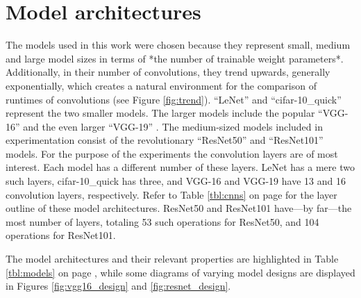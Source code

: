 \section{Model architectures}
The models used in this work were chosen because they represent small, medium and large model sizes in terms of *the number of trainable weight parameters*. Additionally, in their number of convolutions, they trend upwards, generally exponentially, which creates a natural environment for the comparison of runtimes of convolutions (see Figure \ref{fig:trend}). ``LeNet'' \cite{mnist} and ``cifar-10\_quick'' \cite{cifar} represent the two smaller models. The larger models include the popular ``VGG-16'' and the even larger ``VGG-19'' \cite{return}. The medium-sized models included in experimentation consist of the revolutionary ``ResNet50'' and ``ResNet101'' \cite{resnets2} models. For the purpose of the experiments the convolution layers are of most interest. Each model has a different number of these layers. LeNet has a mere two such layers, cifar-10\_quick has three, and VGG-16 and VGG-19 have 13 and 16 convolution layers, respectively. Refer to Table \ref{tbl:cnns} on page \pageref{tbl:cnns} for the layer outline of these model architectures. ResNet50 and ResNet101 have---by far---the most number of layers, totaling 53 such operations for ResNet50, and 104 operations for ResNet101.


The model architectures and their relevant properties are highlighted in Table \ref{tbl:models} on page \pageref{tbl:models}, while some diagrams of varying model designs are displayed in Figures \ref{fig:vgg16_design} and \ref{fig:resnet_design}.



